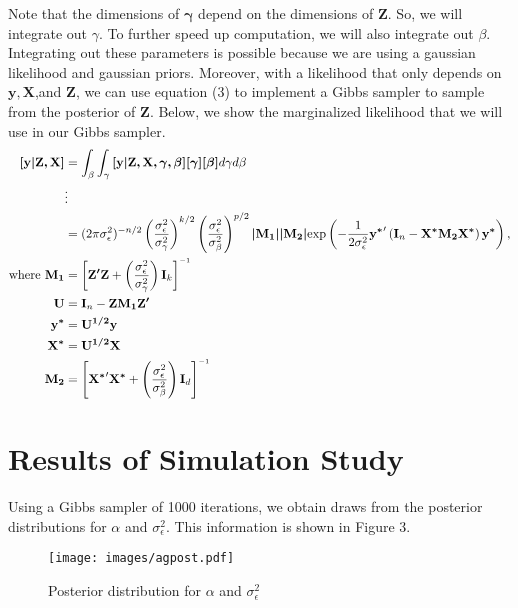 \documentclass[mathserif]{article}
\def\beginmyfig{\begin{figure}[htbp]\begin{center}}
\def\endmyfig{\end{center}\end{figure}}
\def\inv{^{\raisebox{.2ex}{$\scriptscriptstyle-1$}}}
\newcommand{\m}[1]{\mathbf{\bm{#1}}} %
\begin{document}
\noindent
Note that the dimensions of $\m{\gamma}$ depend on the dimensions of $\m{Z}$. So, we will integrate out 
$\gamma$. To further speed up computation, we will also integrate out $\beta$. Integrating out these
parameters is possible because we are using a gaussian likelihood and gaussian priors. Moreover, with
a likelihood that only depends on $\m{y,X}$,and $\m{Z}$, we can use equation (3) to implement a
Gibbs sampler to sample from the posterior of $\m{Z}$. Below, we show the marginalized likelihood that
we will use in our Gibbs sampler.
\begin{align*}
  \m{[y|Z,X]} &= \int_\beta\int_\gamma 
                   \m{[y|Z,X,\gamma,\beta][\gamma][\beta]}
                 d\gamma d\beta\\
              & \vdots \\
              &= (2\pi\sigma_\epsilon^2)^{-n/2} 
                 \left(\frac{\sigma_\epsilon^2}{\sigma_\gamma^2}\right)^{k/2}
                 \left(\frac{\sigma_\epsilon^2}{\sigma_\beta^2}\right)^{p/2}
                 \m{|M_1||M_2|}
                 \text{exp}\left(
                   -\frac{1}{2\sigma_\epsilon^2}\m{y^*}'\left(
                     \m{I}_n-\m{X^*M_2 X^*}
                   \right) \m{y^*}
                 \right),\\
  \text{where } \m{M_1} &= \left[\m{Z'}\m{Z} + \left(\frac{\sigma_\epsilon^2}{\sigma_\gamma^2}\right)\m{I}_k\right]\inv\\
                \m{U}   &= \m{I}_n - \m{ZM_1Z'}\\
                \m{y^*} &= \m{U^{1/2}y}\\
                \m{X^*} &= \m{U^{1/2}X}\\
                \m{M_2} &= \left[\m{X^*}'\m{X^*} + \left(\frac{\sigma_\epsilon^2}{\sigma_\beta^2}\right)\m{I}_d\right]\inv\\
\end{align*}

\section*{Results of Simulation Study}
Using a Gibbs sampler of 1000 iterations, we obtain draws from the posterior distributions for $\alpha$ and
$\sigma_\epsilon^2$. This information is shown in Figure 3.\\
\beginmyfig
  \texttt{[image: images/agpost.pdf]}
  \caption{Posterior distribution for $\alpha$ and $\sigma_\epsilon^2$}
\endmyfig
\end{document}
